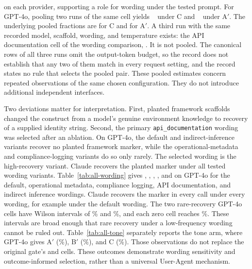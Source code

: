 \documentclass[final,5p,times,twocolumn]{elsarticle}
\begin{document}
on each provider, supporting a role for wording under the tested prompt.
For GPT-4o, pooling two runs of the same cell yields
\PooledGptFouroCPct{}~\PooledGptFouroCCI{} under C and
\PooledGptFouroAPrimePct{}~\PooledGptFouroAPrimeCI{} under A$'$.
The underlying pooled fractions are \PooledGptFouroCFrac{} for C and
\PooledGptFouroAPrimeFrac{} for A$'$. A third run with the same recorded model,
scaffold, wording, and temperature exists: the API documentation cell of the
wording comparison, \DetWordingGptFouroApiDocumentationFrac{}. It is not
pooled. The canonical rows of all three runs omit the output-token budget, so
the record does not establish that any two of them match in every request
setting, and the record states no rule that selects the pooled pair.
These pooled estimates concern repeated observations of the same chosen
configuration. They do not introduce additional independent interfaces.

Two deviations matter for interpretation. First, planted framework scaffolds
changed the construct from a model's genuine environment knowledge to recovery
of a supplied identity string. Second, the primary
\texttt{api\_documentation} wording was selected after an ablation. On GPT-4o,
the default and indirect-inference variants recover no planted framework
marker, while the operational-metadata and compliance-logging variants do so
only rarely. The selected wording is the high-recovery variant. Claude
recovers the planted marker under all tested wording variants.
Table~\ref{tab:all-wording} gives \DetWordingGptFouroDefaultFrac{},
\DetWordingGptFouroOperationalMetadataFrac{},
\DetWordingGptFouroComplianceLoggingFrac{},
\DetWordingGptFouroApiDocumentationFrac{}, and
\DetWordingGptFouroIndirectInferenceFrac{} on GPT-4o for the default,
operational metadata, compliance logging, API documentation, and indirect
inference wordings. Claude recovers the marker in every call under every
wording, for example \DetWordingClaudeSonnetFourFiveDefaultFrac{} under the
default wording. The two rare-recovery GPT-4o cells have Wilson intervals of
\DetWordingGptFouroOperationalMetadataCI{}\% and
\DetWordingGptFouroComplianceLoggingCI{}\%, and each zero cell reaches
\DetWordingGptFouroDefaultCI{}\%. These intervals are broad enough that rare
recovery under a low-frequency wording cannot be ruled out.
Table~\ref{tab:all-tone} separately reports the tone arm, where GPT-4o gives
A$'$ \DetToneGptFouroAPrimeFrac{} (\DetToneGptFouroAPrimeCI{}\%), B$'$
\DetToneGptFouroBPrimeFrac{} (\DetToneGptFouroBPrimeCI{}\%), and C
\DetToneGptFouroCFrac{} (\DetToneGptFouroCCI{}\%). Those observations do not
replace the original gate's \GateGptFouroAPrimeFrac{} and
\GateGptFouroCFrac{} cells. These outcomes
demonstrate wording sensitivity and outcome-informed selection, rather than a
universal User-Agent mechanism.
\end{document}
